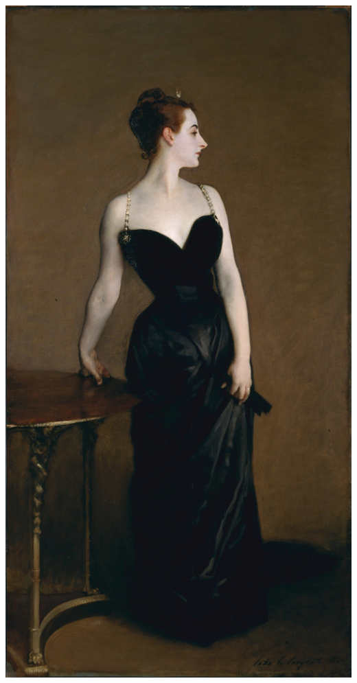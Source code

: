 \documentclass{beamer}
\begin{document}
\begin{frame}{}
\begin{columns}
{            \includegraphics[scale=0.175]{madame_x.jpg}
          }
\end{columns}
\end{frame}
\end{document}
